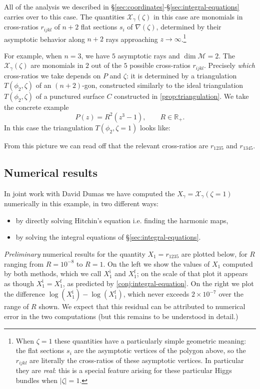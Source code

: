 \documentclass[12pt,letterpaper,reqno]{article}
\numberwithin{equation}{section}
\newcommand{\cM}{\ensuremath{\mathcal M}}
\newcommand{\cX}{\ensuremath{\mathcal X}}
\newcommand{\bbR}{\ensuremath{\mathbb R}}
\newcommand{\abs}[1]{\lvert#1\rvert}
\newcommand{\ti}[1]{\textit{#1}}
\newcommand{\insfig}[2]{

\medskip
\noindent
\begin{minipage}{\linewidth}

\makebox[\linewidth]{\texttt{[image: figures/\#1-crop.pdf]}}

\end{minipage}
\medskip

}
\begin{document}
All of the analysis we described in
\S\ref{sec:coordinates}-\S\ref{sec:integral-equations}
carries over to this case.
The quantities $\cX_\gamma(\zeta)$ in this case are monomials in cross-ratios $r_{ijkl}$ of $n+2$ flat sections $s_i$
of $\nabla(\zeta)$,
determined by their asymptotic behavior along $n+2$ rays
approaching $z \to \infty$.\footnote{When $\zeta = 1$ these quantities have
a particularly simple geometric meaning: the flat sections
$s_i$ are the asymptotic vertices of the
polygon above, so the $r_{ijkl}$ are literally
the cross-ratios of these asymptotic vertices.
In particular they are \ti{real}: this is a special feature
arising for these particular Higgs bundles when 
$\abs{\zeta}=1$.}

For example, when $n=3$, we have $5$ asymptotic rays and $\dim \cM = 2$. The $\cX_\gamma(\zeta)$ are monomials in
$2$ out of the $5$ possible cross-ratios $r_{ijkl}$. 
Precisely \ti{which} cross-ratios we take depends on $P$ and $\zeta$:
it is determined by a triangulation $T(\phi_2, \zeta)$ 
of an $(n+2)$-gon, constructed similarly to the
ideal triangulation $T(\phi_2, \zeta)$ of a punctured surface 
$C$ constructed in \autoref{prop:triangulation}.
We take the concrete example
\begin{equation}
  P(z) = R^2 (z^3 - 1), \qquad R \in \bbR_+.
\end{equation}
In this case the triangulation $T(\phi_2, \zeta = 1)$ looks
like:
\insfig{higgs-metric-16}{0.8}
From this picture we can read off that the 
relevant cross-ratios are $r_{1235}$ and $r_{1345}$.

\subsection{Numerical results}

In joint work with David Dumas we 
have computed the $X_\gamma = \cX_\gamma(\zeta = 1)$ numerically
in this example, in two different ways: 
\begin{itemize}
\item by
directly solving Hitchin's equation i.e. finding
the harmonic maps,
\item
by solving the integral equations of \S\ref{sec:integral-equations}.
\end{itemize}
\ti{Preliminary} numerical results for
the quantity $X_1 = r_{1235}$ are plotted below, for $R$ ranging
from $R = 10^{-8}$ to $R = 1$. On the left we show 
the values of $X_1$ computed by both methods, which we call
 $X_1^{\mathrm i}$ and $X_1^{\mathrm f}$; on the scale of that
plot it appears as though $X_1^{\mathrm i} = X_1^{\mathrm f}$,
as predicted by \autoref{conj:integral-equation}.
On the right we plot the difference
$\log(X_1^{\mathrm i}) - \log(X_1^{\mathrm f})$, 
which never exceeds $2 \times 10^{-7}$ over the range of $R$ shown.
We expect that this residual can be attributed to 
numerical error in the two computations (but this remains to be 
understood in detail.)
\end{document}
